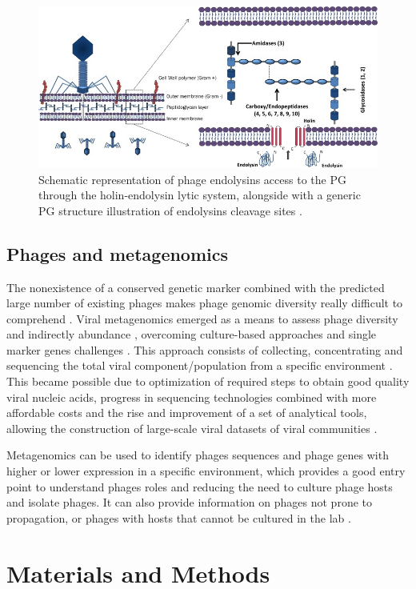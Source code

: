 \documentclass[runningheads]{llncs}
\begin{document}
\begin{figure}
\includegraphics[width=\textwidth]{holin-endolysin-system.jpg}
\caption{Schematic representation of phage endolysins access to the PG through the holin-endolysin lytic system, alongside with a generic PG structure illustration of endolysins cleavage sites \cite{Oliveira2013}.} \label{fig1}
\end{figure}

\subsection{Phages and metagenomics}
The nonexistence of a conserved genetic marker combined with the predicted large number of existing phages makes phage genomic diversity really difficult to comprehend \cite{Dion2020}. Viral metagenomics emerged as a means to assess phage diversity and indirectly abundance \cite{Clokie2011}, overcoming culture-based approaches and single marker genes challenges \cite{Dion2020}. This approach consists of collecting, concentrating and sequencing the total viral component/population from a specific environment \cite{Clokie2011} \cite{Hatfull2011}. This became possible due to optimization of required steps to obtain good quality viral nucleic acids, progress in sequencing technologies combined with more affordable costs and the rise and improvement of a set of analytical tools, allowing the construction of large-scale viral datasets of viral communities \cite{Dion2020}.

Metagenomics can be used to identify phages sequences and phage genes with higher or lower expression in a specific environment, which provides a good entry point to understand phages roles and reducing the need to culture phage hosts and isolate phages. It can also provide information on phages not prone to propagation, or phages with hosts that cannot be cultured in the lab \cite{Clokie2011}. 
%
\section{Materials and Methods}
%
\end{document}
